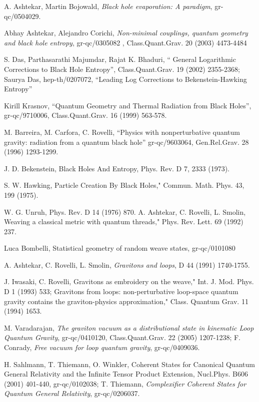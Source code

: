 \documentclass[12pt]{article}
\begin{document}
\begin{thebibliography}{0}
{{{A. Ashtekar, Martin Bojowald, 
{\it  Black hole evaporation: A paradigm}, 
 gr-qc/0504029. 


Abhay Ashtekar, Alejandro Corichi, 
{\it    Non-minimal couplings, quantum geometry and black hole entropy},
gr-qc/0305082 ,  Class.Quant.Grav. 20 (2003) 4473-4484

S. Das, Parthasarathi Majumdar, Rajat K. Bhaduri, ``
General Logarithmic Corrections to Black Hole Entropy'',
Class.Quant.Grav. 19 (2002) 2355-2368;  Saurya Das, hep-th/0207072,
``Leading Log Corrections to Bekenstein-Hawking Entropy''

Kirill Krasnov, ``Quantum Geometry and Thermal
Radiation
from Black Holes'', gr-qc/9710006, Class.Quant.Grav. 16 (1999) 563-578.

M. Barreira, M. Carfora, C. Rovelli,
``Physics with nonperturbative quantum gravity: radiation from a quantum
black hole''
gr-qc/9603064, Gen.Rel.Grav. 28 (1996) 1293-1299.

J. D. Bekenstein, Black Holes And Entropy,
Phys. Rev. D 7, 2333 (1973).

S. W. Hawking,
Particle Creation By Black Holes," Commun. Math. Phys.
43, 199 (1975).

W. G. Unruh, Phys. Rev. D 14 (1976) 870.
A. Ashtekar, C. Rovelli, L. Smolin,
Weaving a classical metric with quantum
threads," Phys. Rev. Lett. 69 (1992) 237.

Luca Bombelli, Statistical geometry of random weave states,
gr-qc/0101080

A. Ashtekar, C. Rovelli, L. Smolin, 
 {\it Gravitons and loops}, D 44 (1991) 1740-1755.

J. Iwasaki, C. Rovelli,
Gravitons as embroidery on the weave," Int. J.
Mod. Phys. D 1 (1993) 533;
Gravitons from loops: non-perturbative loop-space
quantum gravity contains the graviton-physics approximation," Class.
Quantum Grav. 11 (1994) 1653.

M. Varadarajan, {\it The graviton vacuum as a distributional state in kinematic Loop Quantum Gravity}, 
gr-qc/0410120,  Class.Quant.Grav. 22 (2005) 1207-1238;  F. Conrady,
{\it Free vacuum for loop quantum gravity},  gr-qc/0409036. 

H. Sahlmann, T. Thiemann, O. Winkler,
Coherent States for Canonical Quantum General Relativity and the
Infinite Tensor Product Extension, Nucl.Phys. B606 (2001) 401-440,
gr-qc/0102038; T. Thiemann, {\it Complexifier Coherent States for Quantum General Relativity}, 
 gr-qc/0206037. 

}}}
\end{thebibliography}
\end{document}
